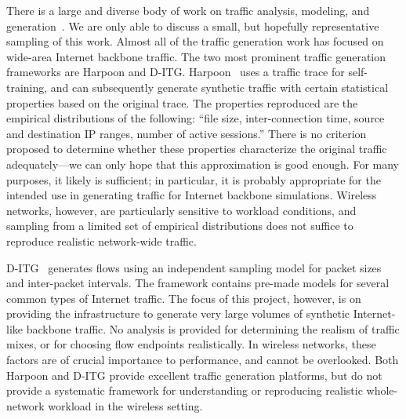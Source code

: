 \documentclass[twocolumn,final]{svjour3}
\newcommand{\caps}[1]{{\small{#1}}}
\newcommand{\FHC}{Hern\'andez-Campos~\textit{et~al.}}
\begin{document}
There is a large and diverse body of work on traffic analysis, modeling, and generation~\cite{Paxson95,Paxson96,Sommers04,Avallone04,Hernandez06:dissertation}. We are only able to discuss a small, but hopefully representative sampling of this work. Almost all of the traffic generation work has focused on wide-area Internet backbone traffic.
The two most prominent traffic generation frameworks are Harpoon and \caps{D-ITG}. Harpoon~\cite{Sommers04} uses a traffic trace for self-training, and can subsequently generate synthetic traffic with certain statistical properties based on the original trace. The properties reproduced are the empirical distributions of the following: ``file size, inter-connection time, source and destination IP ranges, number of active sessions.'' There is no criterion proposed to determine whether these properties characterize the original traffic adequately---we can only hope that this approximation is good enough. For many purposes, it likely is sufficient; in particular, it is probably appropriate for the intended use in generating traffic for Internet backbone simulations. Wireless networks, however, are particularly sensitive to workload conditions, and sampling from a limited set of empirical distributions does not suffice to reproduce realistic network-wide traffic.

\caps{D-ITG}~\cite{Avallone04} generates flows using an independent sampling model for packet sizes and inter-packet intervals. The framework contains pre-made models for several common types of Internet traffic. The focus of this project, however, is on providing the infrastructure to generate very large volumes of synthetic Internet-like backbone traffic. No analysis is provided for determining the realism of traffic mixes, or for choosing flow endpoints realistically. In wireless networks, these factors are of crucial importance to performance, and cannot be overlooked. Both Harpoon and \caps{D-ITG} provide excellent traffic generation platforms, but do not provide a systematic framework for understanding or reproducing realistic whole-network workload in the wireless setting.

\end{document}
